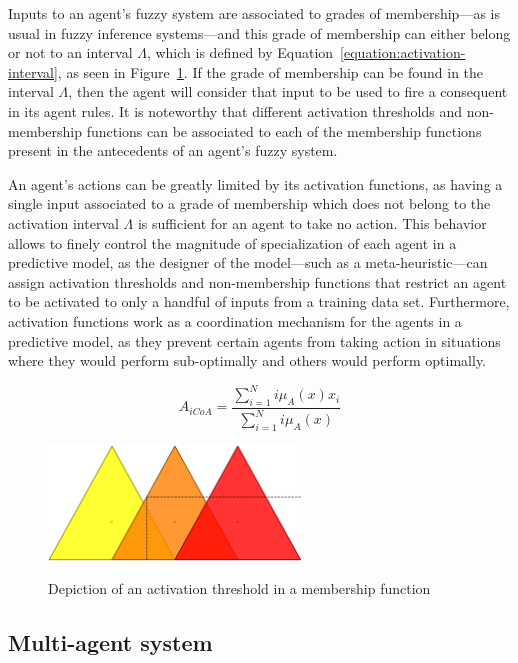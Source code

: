 \documentclass[review]{elsarticle}
\begin{document}
Inputs to an agent's fuzzy system are associated to grades of membership---as
is usual in fuzzy inference systems---and this grade of membership can either
belong or not to an interval $\Lambda$, which is defined by
Equation~\ref{equation:activation-interval}, as seen in
Figure~\ref{figure:activation-threshold}. If the grade of membership can be
found in the interval $\Lambda$, then the agent will consider that input to be
used to fire a consequent in its agent rules. It is noteworthy that different
activation thresholds and non-membership functions can be associated to each of
the membership functions present in the antecedents of an agent's fuzzy system.

An agent's actions can be greatly limited by its activation functions, as
having a single input associated to a grade of membership which does not belong
to the activation interval $\Lambda$ is sufficient for an agent to take no
action. This behavior allows to finely control the magnitude of specialization
of each agent in a predictive model, as the designer of the model---such as a
meta-heuristic---can assign activation thresholds and non-membership functions
that restrict an agent to be activated to only a handful of inputs from a
training data set. Furthermore, activation functions work as a coordination
mechanism for the agents in a predictive model, as they prevent certain agents
from taking action in situations where they would perform sub-optimally and
others would perform optimally.

\begin{equation}
  \label{equation:activation-interval}
  A_{iCoA} = \dfrac{\sum_{i=1}^{N} i\mu_{A}(x) x_{i}}{\sum_{i=1}^{N}
    i\mu_{A}(x)}
\end{equation}

\begin{figure}
  \caption{Depiction of an activation threshold in a membership function}
  \centering
  \includegraphics[width=0.6\textwidth]{img/antecedents.png}
  \label{figure:activation-threshold}
\end{figure}

\subsection{Multi-agent system}
\label{subsection:mult-agent-system}
\end{document}
